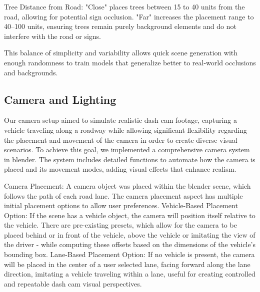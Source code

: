 \documentclass[journal]{IEEEtran}
\begin{document}
Tree Distance from Road:
"Close" places trees between 15 to 40 units from the road, allowing for potential sign occlusion.
"Far" increases the placement range to 40–100 units, ensuring trees remain purely background elements and do not interfere with the road or signs.

This balance of simplicity and variability allows quick scene generation with enough randomness to train models that generalize better to real-world occlusions and backgrounds.

\subsection{Camera and Lighting}
Our camera setup aimed to simulate realistic dash cam footage, capturing a vehicle traveling along a roadway while allowing significant flexibility regarding the placement and movement of the camera in order to create diverse visual scenarios. To achieve this goal, we implemented a comprehensive camera system in blender. The system includes detailed functions to automate how the camera is placed and its movement modes, adding visual effects that enhance realism.

Camera Placement: A camera object was placed within the blender scene, which follows the path of each road lane. The camera placement aspect has multiple initial placement options to allow user preferences. 
Vehicle-Based Placement Option: If the scene has a vehicle object, the camera will position itself relative to the vehicle. There are pre-existing presets, which allow for the camera to be placed behind or in front of the vehicle, above the vehicle or imitating the view of the driver - while computing these offsets based on the dimensions of the vehicle's bounding box.
Lane-Based Placement Option: If no vehicle is present, the camera will be placed in the center of a user selected lane, facing forward along the lane direction, imitating a vehicle traveling within a lane, useful for creating controlled and repeatable dash cam visual perspectives.
\end{document}
